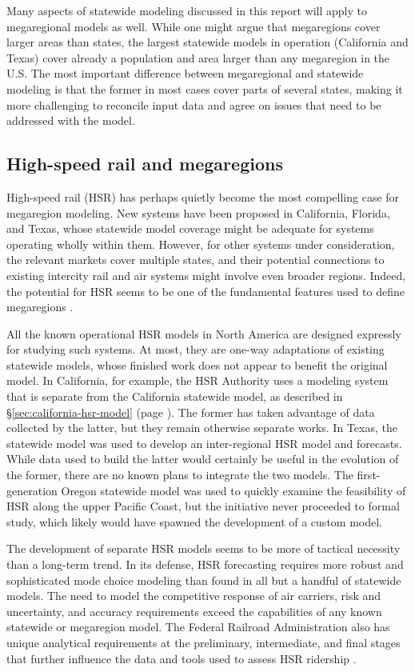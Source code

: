 Many aspects of statewide modeling discussed in this report will apply to megaregional models as well. While one might argue that megaregions cover larger areas than states, the largest statewide models in operation (California and Texas) cover already a population and area larger than any megaregion in the U.S. The most important difference between megaregional and statewide modeling is that the former in most cases cover parts of several states, making it more challenging to reconcile input data and agree on issues that need to be addressed with the model.

\subsection{High-speed rail and megaregions}\label{sec:hsr-megaregions}

High-speed rail (HSR) has perhaps quietly become the most compelling case for megaregion modeling. New systems have been proposed in California, Florida, and Texas, whose statewide model coverage might be adequate for systems operating wholly within them. However, for other systems under consideration, the relevant markets cover multiple states, and their potential connections to existing intercity rail and air systems might involve even broader regions. Indeed, the potential for HSR seems to be one of the fundamental features used to define megaregions \citep{florida09, ross09b}.

All the known operational HSR models in North America are designed expressly for studying such systems. At most, they are one-way adaptations of existing statewide models, whose finished work does not appear to benefit the original model. In California, for example, the HSR Authority uses a modeling system that is separate from the California statewide model, as described in \S\ref{sec:california-hsr-model} (page \pageref{sec:california-hsr-model}). The former has taken advantage of data collected by the latter, but they remain otherwise separate works. In Texas, the statewide model was used to develop an inter-regional HSR model and forecasts. While data used to build the latter would certainly be useful in the evolution of the former, there are no known plans to integrate the two models. The first-generation Oregon statewide model was used to quickly examine the feasibility of HSR along the upper Pacific Coast, but the initiative never proceeded to formal study, which likely would have spawned the development of a custom model.

The development of separate HSR models seems to be more of tactical necessity than a long-term trend. In its defense, HSR forecasting requires more robust and sophisticated mode choice modeling than found in all but a handful of statewide models. The need to model the competitive response of air carriers, risk and uncertainty, and accuracy requirements exceed the capabilities of any known statewide or megaregion model. The Federal Railroad Administration also has unique analytical requirements at the preliminary, intermediate, and final stages that further influence the data and tools used to assess HSR ridership \citep{sdg11}.

